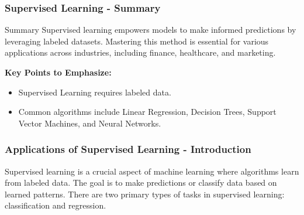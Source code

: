\documentclass[aspectratio=169]{beamer}
\begin{document}
\begin{frame}[fragile]
  \frametitle{Supervised Learning - Summary}
  \begin{block}{Summary}
    Supervised learning empowers models to make informed predictions by leveraging labeled datasets. Mastering this method is essential for various applications across industries, including finance, healthcare, and marketing.
  \end{block}

  \textbf{Key Points to Emphasize:}
  \begin{itemize}
    \item Supervised Learning requires labeled data.
    \item Common algorithms include Linear Regression, Decision Trees, Support Vector Machines, and Neural Networks.
  \end{itemize}
\end{frame}

\begin{frame}[fragile]
    \frametitle{Applications of Supervised Learning - Introduction}
    Supervised learning is a crucial aspect of machine learning where algorithms learn from labeled data. 
    The goal is to make predictions or classify data based on learned patterns. 
    There are two primary types of tasks in supervised learning: 
    classification and regression.
\end{frame}
\end{document}
